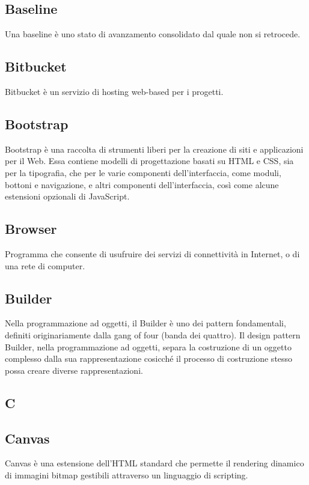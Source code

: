\subsection{Baseline}
Una baseline è uno stato di avanzamento consolidato dal quale non si retrocede. 

\subsection{Bitbucket}
Bitbucket è un servizio di hosting web-based per i progetti.

\subsection{Bootstrap}
Bootstrap è una raccolta di strumenti liberi per la creazione di siti e applicazioni per il Web. Essa contiene modelli di progettazione basati su HTML e CSS, sia per la tipografia, che per le varie componenti dell'interfaccia, come moduli, bottoni e navigazione, e altri componenti dell'interfaccia, così come alcune estensioni opzionali di JavaScript.

\subsection{Browser}
Programma che consente di usufruire dei servizi di connettività in Internet, o di una rete di computer.

\subsection{Builder}
Nella programmazione ad oggetti, il Builder è uno dei pattern fondamentali, definiti originariamente dalla gang of four (banda dei quattro). Il design pattern Builder, nella programmazione ad oggetti, separa la costruzione di un oggetto complesso dalla sua rappresentazione cosicché il processo di costruzione stesso possa creare diverse rappresentazioni.

\newpage

\begin{center}
\Huge\section{\uppercase{C}}
\end{center}

\subsection{Canvas}
Canvas è una estensione dell'HTML standard che permette il rendering dinamico di immagini bitmap gestibili attraverso un linguaggio di scripting.

